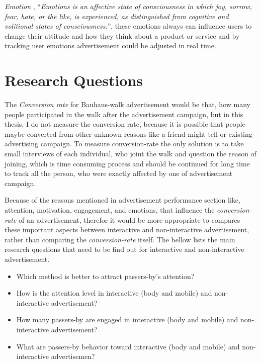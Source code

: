 \emph{Emotion }, ``\emph{Emotions is an affective state of consciousness in which joy, sorrow, fear, hate, or the like, is experienced, as distinguished from cognitive and volitional states of consciousness.}''\cite{emotiondef}, these emotions always can influence users to change their attitude and how they think about a product or service and by tracking user emotions advertisement could be adjusted in real time.




\section{Research Questions}
The \emph{Conversion rate} for Bauhaus-walk advertisement would be that, how many people participated in the walk after the advertisement campaign, but in this thesis, I do not measure the conversion rate, because it is possible that people maybe converted from other unknown reasons like a friend might tell or existing advertising campaign. To measure conversion-rate the only solution is to take small interviews of each individual, who joint the walk and question the reason of joining, which is time consuming process and should be continued for long time to track all the person, who were exactly affected by one of advertisement campaign.

Because of the reasons mentioned in advertisement performance section like, attention, motivation, engagement, and emotions, that influence the \emph{conversion-rate} of an advertisement, therefor it would be more appropriate to compares these important aspects between interactive and non-interactive advertisement, rather than comparing the \emph{conversion-rate} itself. The bellow lists the main research questions that need to be find out for interactive and non-interactive advertisement.


\begin{itemize}
\item Which method is better to attract passers-by's attention? 
\item How is the attention level in interactive (body and mobile) and non-interactive advertisement?
\item How many passers-by are engaged in interactive (body and mobile) and non-interactive advertisement?
\item What are passers-by behavior toward interactive (body and mobile) and non-interactive advertisemen?
\end{itemize}

